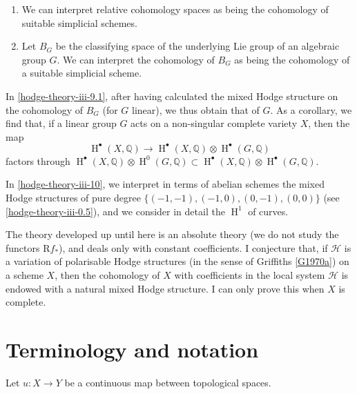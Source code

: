   
 \begin{enumerate}
    
 \item[(a)]
      We can interpret relative cohomology spaces as being the cohomology of suitable simplicial schemes.
    

    
 \item[(b)]
      Let \(B_G\) be the classifying space of the underlying Lie group of an algebraic group \(G\).
      We can interpret the cohomology of \(B_G\) as being the cohomology of a suitable simplicial scheme.
    

  \end{enumerate}\par{}In \cref{hodge-theory-iii-9.1}, after having calculated the mixed Hodge structure on the cohomology of \(B_G\) (for \(G\) linear), we thus obtain that of \(G\).
  As a corollary, we find that, if a linear group \(G\) acts on a non-singular complete variety \(X\), then the map
  \[     \operatorname {H}^\bullet (X,\mathbb {Q})     \to  \operatorname {H}^\bullet (X,\mathbb {Q})\otimes \operatorname {H}^\bullet (G,\mathbb {Q})   \]
  factors through \(\operatorname {H}^\bullet (X,\mathbb {Q})\otimes \operatorname {H}^0(G,\mathbb {Q})\subset \operatorname {H}^\bullet (X,\mathbb {Q})\otimes \operatorname {H}^\bullet (G,\mathbb {Q})\).\par{}In \cref{hodge-theory-iii-10}, we interpret in terms of abelian schemes the mixed Hodge structures of pure degree \(\{(-1,-1),(-1,0),(0,-1),(0,0)\}\) (see \cref{hodge-theory-iii-0.5}), and we consider in detail the \(\operatorname {H}^1\) of curves.\par{}The theory developed up until here is an absolute theory (we do not study the functors \(\mathrm {R} f_*\)), and deals only with constant coefficients.
  I conjecture that, if \(\mathscr {H}\) is a variation of polarisable Hodge structures (in the sense of Griffiths \hyperref[G1970a]{[G1970a]}) on a scheme \(X\), then the cohomology of \(X\) with coefficients in the local system \(\mathscr {H}\) is endowed with a natural mixed Hodge structure.
  I can only prove this when \(X\) is complete.\chapter{Terminology and notation}\thispagestyle{fancy}\label{hodge-theory-iii-terminology-and-notation}\label{hodge-theory-iii-0.1}\par{}Let \(u\colon  X\to  Y\) be a continuous map between topological spaces.
